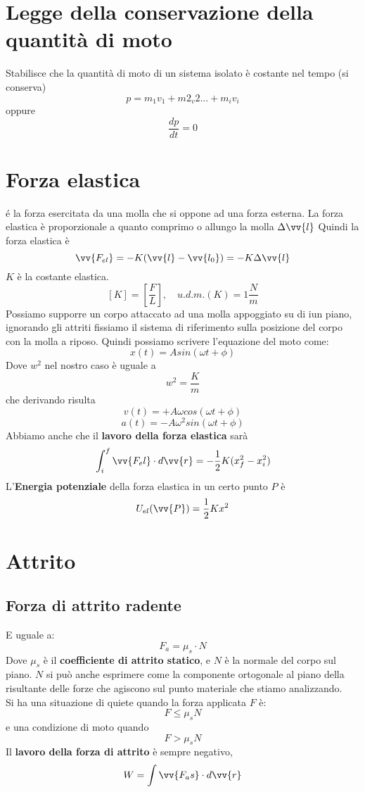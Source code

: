 \documentclass[a4paper]{report}
\begin{document}
  \section{Legge della conservazione della quantità di moto}
  Stabilisce che la quantità di moto di un sistema isolato è costante nel tempo (si conserva)
  $$ p = m_1v_1 + m2_v2 ... + m_iv_i $$
  oppure
  $$ \frac{dp}{dt} = 0 $$

  \section{Forza elastica}
  é la forza esercitata da una molla che si oppone ad una forza esterna. La forza elastica è proporzionale a quanto comprimo o allungo la molla $\Delta \vv{l}$
  Quindi la forza elastica è
  $$ \vv{F_{el}} = -K(\vv{l} - \vv{l_0}) = -K \Delta \vv{l} $$
  $K$ è la costante elastica.
  $$[K] = [\frac{F}{L}], \quad u.d.m.(K) = 1 \frac{N}{m}$$
  Possiamo supporre un corpo attaccato ad una molla appoggiato su di iun piano, ignorando gli attriti fissiamo il sistema di riferimento sulla posizione del corpo con la molla a riposo. Quindi possiamo scrivere l'equazione del moto come:
  $$x(t) = A sin(\omega t + \phi)$$
  Dove $w^2$ nel nostro caso è uguale a
  $$ w^2 = \frac{K}{m} $$
  che derivando risulta
  $$ v(t) = + A \omega cos(\omega t + \phi) $$
  $$ a(t) = -A \omega^2 sin (\omega t + \phi) $$
  Abbiamo anche che il \textbf{lavoro della forza elastica} sarà
  $$ \int_i^f \vv{F_el} \cdot d\vv{r} = - \frac{1}{2} K (x_f^2 -x_i^2)$$
  L'\textbf{Energia potenziale} della forza elastica in un certo punto $P$ è
  $$ U_{el}(\vv{P}) = \frac{1}{2} K x^2$$


  \section{Attrito}
  \subsection{Forza di attrito radente}
  E uguale a:
  $$ F_a = \mu_s \cdot N$$
  Dove $\mu_s$ è il \textbf{coefficiente di attrito statico}, e $N$ è la normale del corpo sul piano. $N$ si può anche esprimere come la componente ortogonale al piano della risultante delle forze che agiscono sul punto materiale che stiamo analizzando.
  \\Si ha una situazione di quiete quando la forza applicata $F$ è:
  $$ F \leq \mu_s N $$
  e una condizione di moto quando
  $$ F > \mu_s N $$
  Il \textbf{lavoro della forza di attrito} è sempre negativo,
  $$ W = \int \vv{F_as} \cdot d\vv{r}$$
\end{document}
